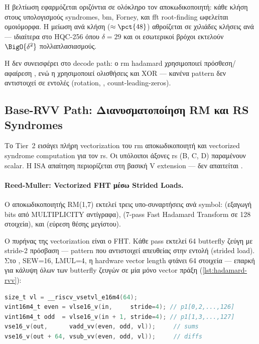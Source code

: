 Η βελτίωση εφαρμόζεται οριζόντια σε ολόκληρο τον αποκωδικοποιητή: κάθε
κλήση  στους υπολογισμούς syndromes, \gls{bm}, Forney, και
\gls{fft} root-finding ωφελείται ομοιόμορφα.  Η μείωση ανά κλήση
($\approx\pct{48}$) αθροίζεται σε χιλιάδες κλήσεις ανά \Decaps — ιδιαίτερα
στο HQC-256 όπου $\delta = 29$ και οι εσωτερικοί βρόχοι εκτελούν
$\BigO{\delta^2}$ πολλαπλασιασμούς.

Η \Zbb δεν συνεισφέρει στο decode path: ο \gls{rm} hadamard χρησιμοποιεί
πρόσθεση/αφαίρεση , ενώ η  χρησιμοποιεί
ολισθήσεις και XOR — κανένα pattern δεν αντιστοιχεί σε \Zbb εντολές
(rotation, , count-leading-zeros).

\subsection{Base-RVV Path: Διανυσματοποίηση RM και RS Syndromes}
\label{sec:decode-rvv}

Το Tier~2 εισάγει πλήρη \RVV vectorization του \gls{rm} αποκωδικοποιητή
και vectorized syndrome computation για τον \gls{rs}.  Οι υπόλοιποι άξονες
\gls{rs} (B, C, D) παραμένουν scalar.  Η ISA απαίτηση περιορίζεται στη
βασική V extension — δεν απαιτείται \Zvbc.

\paragraph{Reed-Muller: Vectorized FHT μέσω Strided Loads.}
Ο αποκωδικοποιητής RM(1,7) εκτελεί τρεις υπο-συναρτήσεις ανά symbol:
 (εξαγωγή bits από MULTIPLICITY αντίγραφα),
 (7-pass Fast Hadamard Transform σε \num{128} στοιχεία),
και  (εύρεση θέσης μεγίστου).

Ο πυρήνας της vectorization είναι ο FHT.  Κάθε pass εκτελεί \num{64}
butterfly ζεύγη με stride-2 πρόσβαση — pattern που αντιστοιχεί απευθείας
στην εντολή  (strided load).  Στο , SEW=16, LMUL=4,
η hardware vector length φτάνει \num{64} στοιχεία — επαρκή για κάλυψη
όλων των butterfly ζευγών σε μία μόνο vector πράξη (\cref{lst:hadamard-rvv}):

\begin{lstlisting}[language=C, caption={Vectorized FHT butterfly pass.},
  label={lst:hadamard-rvv}]
size_t vl = __riscv_vsetvl_e16m4(64);
vint16m4_t even = vlse16_v(in,     stride=4); // p1[0,2,...,126]
vint16m4_t odd  = vlse16_v(in + 1, stride=4); // p1[1,3,...,127]
vse16_v(out,      vadd_vv(even, odd, vl));     // sums
vse16_v(out + 64, vsub_vv(even, odd, vl));     // diffs
\end{lstlisting}

